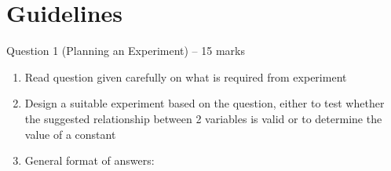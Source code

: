 \documentclass{article}
\begin{document}
\newpage



\section*{Guidelines}
Question 1 (Planning an Experiment) – 15 marks
 \begin{enumerate}
     \item Read question given carefully on what is required from experiment
      \item Design a suitable experiment based on the question, either to test whether the suggested relationship between 2 variables is valid or to determine the value of a constant
     \item General format of answers:
 \end{enumerate}


    

   
   
\end{document}
